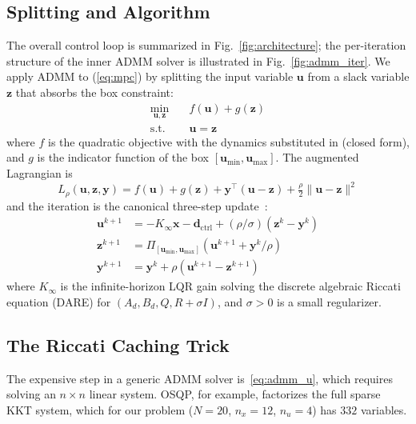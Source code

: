 \documentclass[conference]{IEEEtran}
\begin{document}
\subsection{Splitting and Algorithm}

The overall control loop is summarized in Fig.~\ref{fig:architecture}; the per-iteration structure of the inner ADMM solver is illustrated in Fig.~\ref{fig:admm_iter}. We apply ADMM to (\ref{eq:mpc}) by splitting the input variable $\bm{u}$ from a slack variable $\bm{z}$ that absorbs the box constraint:
\begin{equation}
\begin{aligned}
\min_{\bm{u}, \bm{z}} \quad & f(\bm{u}) + g(\bm{z}) \\
\text{s.t.} \quad & \bm{u} = \bm{z}
\end{aligned}
\end{equation}
where $f$ is the quadratic objective with the dynamics substituted in (closed form), and $g$ is the indicator function of the box $[\bm{u}_\text{min}, \bm{u}_\text{max}]$. The augmented Lagrangian is
\begin{equation}
L_\rho(\bm{u}, \bm{z}, \bm{y}) = f(\bm{u}) + g(\bm{z}) + \bm{y}^\top(\bm{u} - \bm{z}) + \tfrac{\rho}{2}\|\bm{u} - \bm{z}\|^2
\end{equation}
and the iteration is the canonical three-step update~\cite{boyd2011admm}:
\begin{align}
\bm{u}^{k+1} &= -K_\infty \bm{x} - \bm{d}_\text{ctrl} + (\rho/\sigma)(\bm{z}^k - \bm{y}^k) \label{eq:admm_u} \\
\bm{z}^{k+1} &= \Pi_{[\bm{u}_\text{min}, \bm{u}_\text{max}]}(\bm{u}^{k+1} + \bm{y}^k / \rho) \label{eq:admm_z} \\
\bm{y}^{k+1} &= \bm{y}^k + \rho(\bm{u}^{k+1} - \bm{z}^{k+1}) \label{eq:admm_y}
\end{align}
where $K_\infty$ is the infinite-horizon LQR gain solving the discrete algebraic Riccati equation (DARE) for $(A_d, B_d, Q, R + \sigma I)$, and $\sigma > 0$ is a small regularizer.

\subsection{The Riccati Caching Trick}

The expensive step in a generic ADMM solver is~\eqref{eq:admm_u}, which requires solving an $n \times n$ linear system. OSQP, for example, factorizes the full sparse KKT system, which for our problem ($N = 20$, $n_x = 12$, $n_u = 4$) has $332$ variables.
\end{document}

